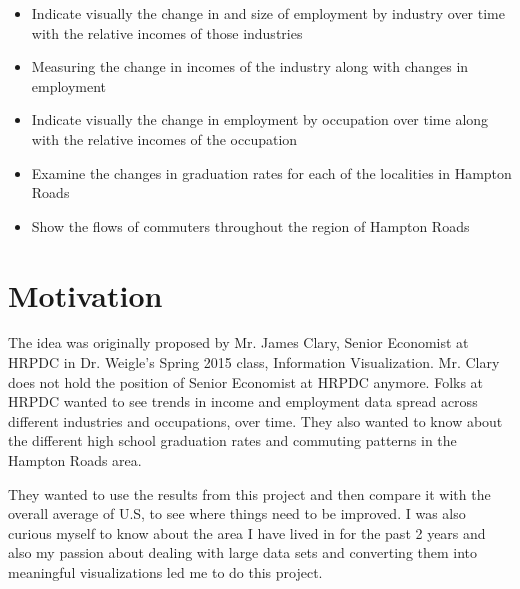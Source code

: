 \documentclass[12pt]{article}
\begin{document}
\begin{itemize}

\item Indicate visually the change in	and	size of	employment by industry over time with the relative incomes of those	industries
\item Measuring	the	change in incomes of the industry along	with changes in	employment 
\item Indicate visually	the	change	in	employment	by	occupation	over time along	with the relative incomes of the occupation
\item Examine the changes in graduation	rates for each of the localities in Hampton Roads
\item Show the flows of commuters throughout the region of Hampton Roads

\end{itemize}

\newpage

\section{Motivation}
The idea was originally proposed by  Mr. James Clary, Senior Economist at HRPDC in Dr. Weigle's Spring 2015 class, Information Visualization. Mr. Clary does not hold the position of Senior Economist at HRPDC anymore. Folks at HRPDC wanted to see trends in income and employment data spread across different industries and occupations, over time. They also wanted to know about the different high school graduation rates and commuting patterns in the Hampton Roads area.

They wanted to use the results from this project and then compare it with the overall average of U.S, to see where things need to be improved. I was also curious myself to know about the area I have lived in for the past 2 years and also my passion about dealing with large data sets and converting them into meaningful visualizations led me to do this project.

\newpage
\end{document}
